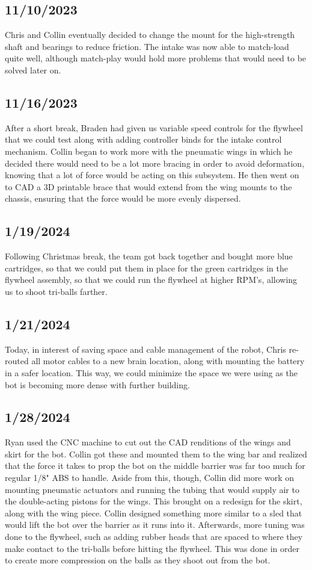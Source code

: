 \subsection{11/10/2023}
Chris and Collin eventually decided to change the mount for the high-strength shaft and bearings to reduce friction. The intake was now able to match-load quite well, although match-play would hold more problems that would need to be solved later on.
\subsection{11/16/2023}
After a short break, Braden had given us variable speed controls for the flywheel that we could test along with adding controller binds for the intake control mechanism. Collin began to work more with the pneumatic wings in which he 
decided there would need to be a lot more bracing in order to avoid deformation, knowing that a lot of force would be acting on this subsystem.
He then went on to CAD a 3D printable brace that would extend from the wing mounts to the chassis, ensuring that the force would be more evenly dispersed.
\subsection{1/19/2024}
Following Christmas break, the team got back together and bought more blue cartridges, so that we
 could put them in place for the green cartridges in the flywheel assembly, so that we could run the flywheel at higher RPM's, allowing us to shoot tri-balls farther.
\subsection{1/21/2024}
Today, in interest of saving space and cable management of the robot, Chris re-routed all motor cables to a new brain location, 
along with mounting the battery in a safer location. This way, we could minimize the space we were using as the bot is becoming more dense with further building.
\subsection{1/28/2024}
Ryan used the CNC machine to cut out the CAD renditions of the wings and skirt for the bot. Collin got these and mounted them to the wing bar and realized that the force it takes to prop
 the bot on the middle barrier was far too much for regular 1/8" ABS to handle. Aside from this, though, Collin did more work on mounting pneumatic actuators and running the tubing that would supply air to the double-acting pistons for the wings. This brought on a redesign for the skirt, along with the wing piece. Collin designed something more 
 similar to a sled that would lift the bot over the barrier as it runs into it. Afterwards, more tuning was done to the flywheel, such as adding rubber heads that are spaced to where they 
 make contact to the tri-balls before hitting the flywheel. This was done in order to create more compression on the balls as they shoot out from the bot. 
